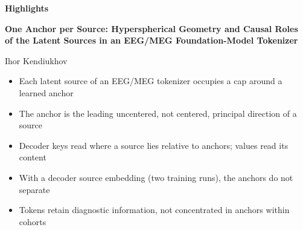 \documentclass[11pt]{article}
\begin{document}
\begin{center}\textbf{\large Highlights}\end{center}

\noindent\textbf{One Anchor per Source: Hyperspherical Geometry and Causal Roles of the
Latent Sources in an EEG/MEG Foundation-Model Tokenizer}

\medskip
\noindent Ihor Kendiukhov

\bigskip
\begin{itemize}
\item Each latent source of an EEG/MEG tokenizer occupies a cap around a learned anchor
\item The anchor is the leading uncentered, not centered, principal direction of a source
\item Decoder keys read where a source lies relative to anchors; values read its content
\item With a decoder source embedding (two training runs), the anchors do not separate
\item Tokens retain diagnostic information, not concentrated in anchors within cohorts
\end{itemize}
\end{document}
